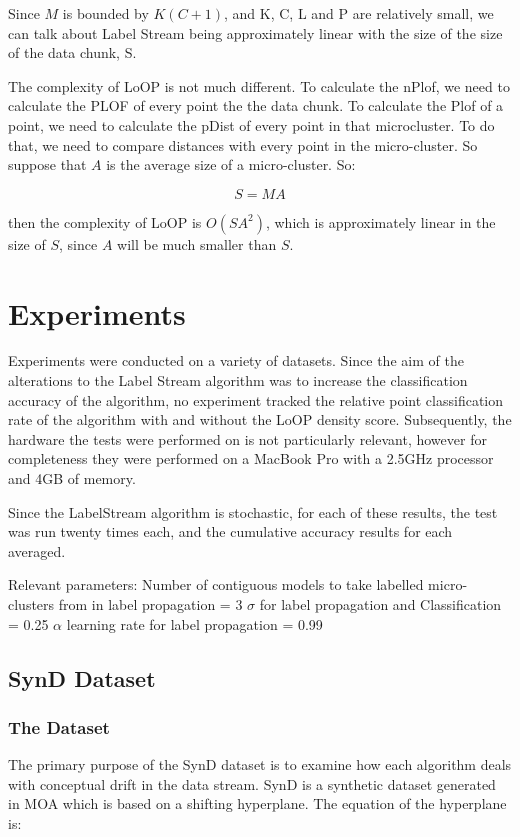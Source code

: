 \documentclass[12pt,a4paper,oneside]{report}
\begin{document}
Since $M$ is bounded by $K(C+1)$, and K, C, L and P are relatively small, we can talk about Label Stream being approximately linear with the size of the size of the data chunk, S. 

The complexity of LoOP is not much different. To calculate the nPlof, we need to calculate the PLOF of every point the the data chunk.  To calculate the Plof of a point, we need to calculate the pDist of every point in that microcluster. To do that, we need to compare distances with every point in the micro-cluster. So suppose that $A$ is the average size of a micro-cluster. So:

\[S = MA\]

then the complexity of LoOP is $O(SA^2)$, which is approximately linear in the size of $S$, since $A$ will be much smaller than $S$.

\section*{Experiments}
Experiments were conducted on a variety of datasets. Since the aim of the alterations to the Label Stream algorithm was to increase the classification accuracy of the algorithm, no experiment tracked the relative point classification rate of the algorithm with and without the LoOP density score. Subsequently, the hardware the tests were performed on is not particularly relevant, however for completeness they were performed on a MacBook Pro with a 2.5GHz processor and 4GB of memory. 

Since the LabelStream algorithm is stochastic, for each of these results, the test was run twenty times each, and the cumulative accuracy results for each averaged. 

Relevant parameters:
Number of contiguous models to take labelled micro-clusters from in label propagation = $3$
$\sigma$ for label propagation and Classification = 0.25
$\alpha$ learning rate for label propagation = 0.99

\subsection*{SynD Dataset}

\subsubsection*{The Dataset}
The primary purpose of the SynD dataset is to examine how each algorithm deals with conceptual drift in the data stream. SynD is a synthetic dataset generated in MOA which is based on a shifting hyperplane. The equation of the hyperplane is:
\end{document}
